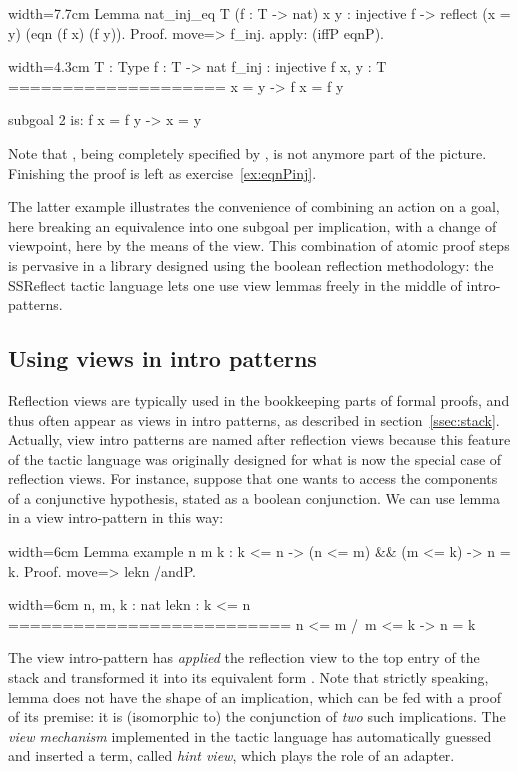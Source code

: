 \begin{coq}{}{width=7.7cm}
Lemma nat_inj_eq T (f : T -> nat) x y :
  injective f ->
    reflect (x = y) (eqn (f x) (f y)).
Proof.
move=> f_inj.
apply: (iffP eqnP).
\end{coq}
\begin{coqout}{}{width=4.3cm}
T : Type
f : T -> nat
f_inj : injective f
x, y : T
====================
x = y -> f x = f y

subgoal 2 is:
 f x = f y -> x = y
\end{coqout}
Note that , being completely specified by , is not
anymore part of the picture.  Finishing the proof is left as
exercise~\ref{ex:eqnPinj}.

The latter example illustrates the convenience of combining an action
on a goal, here breaking an equivalence into one subgoal per
implication, with a change of viewpoint, here by the means of the
 view. This combination of atomic proof steps is pervasive in
a library designed using the boolean reflection methodology: the
SSReflect tactic language lets one use view lemmas freely
in the middle of intro-patterns.

\subsection{Using views in intro patterns}

Reflection views are typically used in the bookkeeping parts of formal
proofs, and thus often appear as views in intro patterns, as described
in section~\ref{ssec:stack}. Actually, view intro patterns are named
after reflection views because this feature of the tactic language was
originally designed for what is now the special case of reflection
views. For instance, suppose
that one wants to access the components of a conjunctive hypothesis,
stated as a boolean conjunction. We can use lemma  in a view
intro-pattern in this way:

\begin{coq}{}{width=6cm}
Lemma example n m k : k <= n ->
  (n <= m) && (m <= k) -> n = k.
Proof.
move=> lekn /andP.
\end{coq}
\begin{coqout}{}{width=6cm}
n, m, k : nat
lekn : k <= n
==========================
 n <= m /\ m <= k -> n = k
\end{coqout}

The view intro-pattern  has \emph{applied} the reflection
view  to
the top entry of the stack  and transformed it into
its equivalent form . Note that strictly
speaking, lemma  does not have the shape of an implication,
which can be fed with a proof of its premise: it is (isomorphic to) the
conjunction of \emph{two} such implications. The \emph{view mechanism}
implemented in the tactic language has automatically guessed and
inserted a term, called \emph{hint view}, which plays the role of an
adapter.

